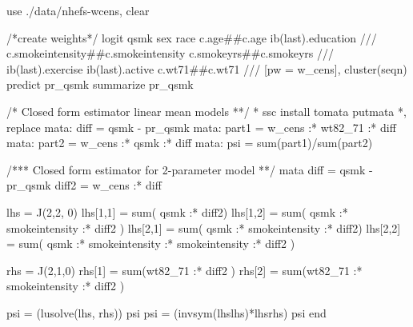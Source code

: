 \documentclass[
  10pt,
  a4paper,
]{book}
\newenvironment{Shaded}{\begin{snugshade}}{\end{snugshade}}
\newcommand{\CommentTok}[1]{\textcolor[rgb]{0.37,0.37,0.37}{#1}}
\newcommand{\FunctionTok}[1]{\textcolor[rgb]{0.28,0.35,0.67}{#1}}
\newcommand{\KeywordTok}[1]{\textcolor[rgb]{0.00,0.46,0.62}{#1}}
\newcommand{\NormalTok}[1]{\textcolor[rgb]{0.00,0.46,0.62}{#1}}
\begin{document}
\begin{Shaded}
\begin{Highlighting}[]
\KeywordTok{use}\NormalTok{ ./}\KeywordTok{data}\NormalTok{/nhefs{-}wcens, }\KeywordTok{clear}

\CommentTok{/*create weights*/}
\KeywordTok{logit}\NormalTok{ qsmk sex race c.age\#\#c.age ib(}\FunctionTok{last}\NormalTok{).education }\CommentTok{///}
\NormalTok{  c.smokeintensity\#\#c.smokeintensity c.smokeyrs\#\#c.smokeyrs }\CommentTok{///}
\NormalTok{  ib(}\FunctionTok{last}\NormalTok{).exercise ib(}\FunctionTok{last}\NormalTok{).active c.wt71\#\#c.wt71 }\CommentTok{///}
\NormalTok{  [pw = w\_cens], }\KeywordTok{cluster}\NormalTok{(seqn)}
\KeywordTok{predict}\NormalTok{ pr\_qsmk}
\KeywordTok{summarize}\NormalTok{ pr\_qsmk}

\CommentTok{/* Closed form estimator linear mean models  **/}
\NormalTok{* }\KeywordTok{ssc}\NormalTok{ install tomata}
\NormalTok{putmata *, }\KeywordTok{replace}
\KeywordTok{mata}\NormalTok{: }\FunctionTok{diff}\NormalTok{ = qsmk {-} pr\_qsmk}
\KeywordTok{mata}\NormalTok{: part1 = w\_cens :* wt82\_71 :* }\FunctionTok{diff}
\KeywordTok{mata}\NormalTok{: part2 = w\_cens :* qsmk :* }\FunctionTok{diff}
\KeywordTok{mata}\NormalTok{: psi = }\KeywordTok{sum}\NormalTok{(part1)/}\KeywordTok{sum}\NormalTok{(part2)}

\CommentTok{/*** Closed form estimator for 2{-}parameter model **/}
\KeywordTok{mata}
\FunctionTok{diff}\NormalTok{ = qsmk {-} pr\_qsmk}
\NormalTok{diff2 = w\_cens :* }\FunctionTok{diff}

\NormalTok{lhs = }\FunctionTok{J}\NormalTok{(2,2, 0)}
\NormalTok{lhs[1,1] = }\KeywordTok{sum}\NormalTok{( qsmk :* diff2)}
\NormalTok{lhs[1,2] = }\KeywordTok{sum}\NormalTok{( qsmk :* smokeintensity :* diff2 )}
\NormalTok{lhs[2,1] = }\KeywordTok{sum}\NormalTok{( qsmk :* smokeintensity :* diff2)}
\NormalTok{lhs[2,2] = }\KeywordTok{sum}\NormalTok{( qsmk :* smokeintensity :* smokeintensity :* diff2 )}
                                                                
\NormalTok{rhs = }\FunctionTok{J}\NormalTok{(2,1,0)}
\NormalTok{rhs[1] = }\KeywordTok{sum}\NormalTok{(wt82\_71 :* diff2 )}
\NormalTok{rhs[2] = }\KeywordTok{sum}\NormalTok{(wt82\_71 :* smokeintensity :* diff2 )}

\NormalTok{psi = (}\KeywordTok{lusolve}\NormalTok{(lhs, rhs))\textquotesingle{}}
\NormalTok{psi}
\NormalTok{psi = (}\FunctionTok{invsym}\NormalTok{(lhs\textquotesingle{}lhs)*lhs\textquotesingle{}rhs)\textquotesingle{}}
\NormalTok{psi}
\KeywordTok{end}
\end{Highlighting}
\end{Shaded}
\end{document}
